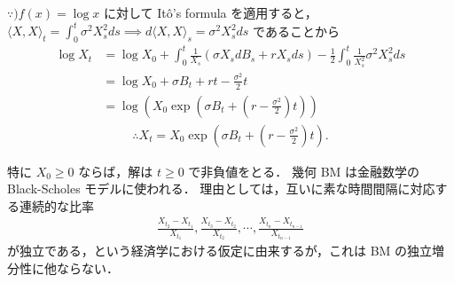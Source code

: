 \documentclass{jsarticle}
\begin{document}
\begin{screen}
    $\because) f(x)=\log x$ に対して It\^{o}'s formula を適用すると，$\langle X, X\rangle_t=\int_0^t \sigma^2 X_s^2 ds\implies d\langle X, X\rangle_s=\sigma^2 X_s^2 ds$ であることから
    \begin{align}
        \log{X_t}
        &= \log{X_0}
        + \int_0^t\frac{1}{X_s}(\sigma X_s dB_s+rX_s ds)
        -\frac{1}{2}\int_0^t \frac{1}{X_s^2}\sigma^2 X_s^2 ds \\
        &= \log{X_0}
        + \sigma B_t
        + rt
        -\frac{\sigma^2}{2}t \\
        &= \log(X_0\exp(\sigma B_t+(r-\frac{\sigma^2}{2})t))
    \end{align}
    \begin{align}
        \therefore X_t
        = X_0\exp(\sigma B_t+(r-\frac{\sigma^2}{2})t).
    \end{align}
\end{screen}

特に $X_0\ge0$ ならば，解は $t\ge0$ で非負値をとる．
幾何 BM は金融数学の Black-Scholes モデルに使われる．
理由としては，互いに素な時間間隔に対応する連続的な比率
\begin{align}
    \frac{X_{t_2}-X_{t_1}}{X_{t_1}}, 
    \frac{X_{t_3}-X_{t_2}}{X_{t_2}}, \dotsb, 
    \frac{X_{t_n}-X_{t_{n-1}}}{X_{t_{n-1}}}
\end{align}
が独立である，という経済学における仮定に由来するが，これは BM の独立増分性に他ならない．
\end{document}
